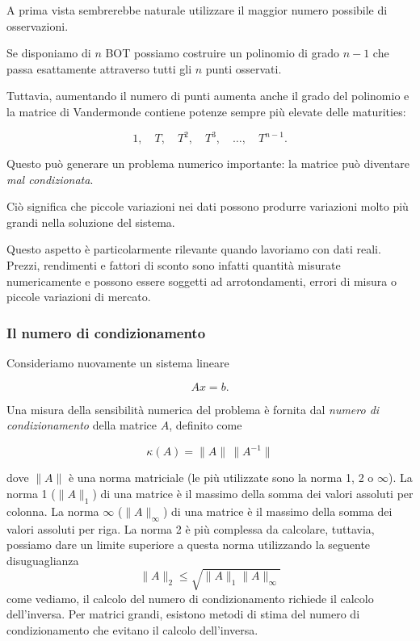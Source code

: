 A prima vista sembrerebbe naturale utilizzare il maggior numero
possibile di osservazioni.

Se disponiamo di $n$ BOT possiamo costruire un polinomio di grado
$n-1$ che passa esattamente attraverso tutti gli $n$ punti osservati.

Tuttavia, aumentando il numero di punti aumenta anche il grado del
polinomio e la matrice di Vandermonde contiene potenze sempre più
elevate delle maturities:

\begin{equation*}
    1,\quad T,\quad T^2,\quad T^3,\quad\ldots,\quad T^{n-1}.
\end{equation*}

Questo può generare un problema numerico importante: la matrice può
diventare \emph{mal condizionata}.

Ciò significa che piccole variazioni nei dati possono produrre
variazioni molto più grandi nella soluzione del sistema.

Questo aspetto è particolarmente rilevante quando lavoriamo con dati
reali. Prezzi, rendimenti e fattori di sconto sono infatti quantità
misurate numericamente e possono essere soggetti ad arrotondamenti,
errori di misura o piccole variazioni di mercato.


\subsubsection{Il numero di condizionamento}

Consideriamo nuovamente un sistema lineare

\begin{equation*}
    Ax=b.
\end{equation*}

Una misura della sensibilità numerica del problema è fornita dal
\emph{numero di condizionamento} della matrice $A$, definito come

\begin{equation*}
    \kappa(A)=\|A\|\,\|A^{-1}\|
    \label{eq:condition-number}
\end{equation*}

dove $\|A\|$ è una norma matriciale (le più utilizzate sono la norma 1, 2 o $\infty$). La norma 1 ($\|A\|_1$) di una matrice è il massimo della somma dei valori assoluti per colonna. La norma $\infty$ ($\|A\|_\infty$) di una matrice è il massimo della somma dei valori assoluti per riga. La norma 2 è più complessa da calcolare, tuttavia, possiamo dare un limite superiore a questa norma utilizzando la seguente disuguaglianza
\[
\|A\|_2 \leq \sqrt{\|A\|_1 \|A\|_\infty}
\] 
come vediamo, il calcolo del numero di condizionamento richiede il calcolo dell'inversa. Per matrici grandi, esistono metodi di stima del numero di condizionamento che evitano il calcolo dell'inversa. 

